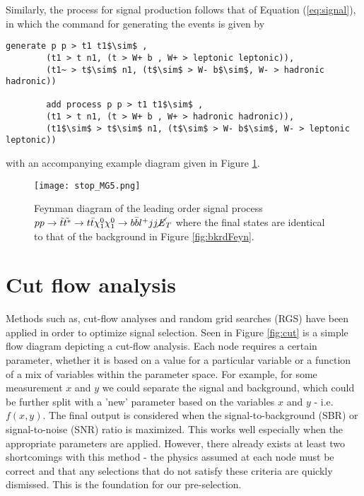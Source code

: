 Similarly, the process for signal production follows that of Equation (\ref{eq:signal}), in which the command for generating the events is given by
\begin{lstlisting}[mathescape = true]
        generate p p > t1 t1$\sim$ ,
        (t1 > t n1, (t > W+ b , W+ > leptonic leptonic)),
        (t1~ > t$\sim$ n1, (t$\sim$ > W- b$\sim$, W- > hadronic hadronic))
        
        add process p p > t1 t1$\sim$ , 
        (t1 > t n1, (t > W+ b , W+ > hadronic hadronic)), 
        (t1$\sim$ > t$\sim$ n1, (t$\sim$ > W- b$\sim$, W- > leptonic leptonic))
\end{lstlisting}
with an accompanying example diagram given in Figure \ref{fig:sigFeyn}. \\


\begin{figure}[htbp]
    \centering
    \texttt{[image: stop\_MG5.png]}
    \caption{Feynman diagram of the leading order signal process $ pp \rightarrow \Tilde{t}\Tilde{t^*} \rightarrow t \Bar{t} \chi^0_1\chi^0_1 \rightarrow b\Bar{b}l^{+}jj\cancel{\it{E}}_{T} $ where the final states are identical to that of the background in Figure \ref{fig:bkrdFeyn}. }
    \label{fig:sigFeyn}
\end{figure}



\section{Cut flow analysis}
Methods such as, cut-flow analyses \cite{kraml2016scalar, aad2014search} and random grid searches (RGS) \cite{bhat2018optimizing} have been applied in order to optimize signal selection. Seen in Figure \ref{fig:cut} is a simple flow diagram depicting a cut-flow analysis. Each node requires a certain parameter, whether it is based on a value for a particular variable or a function of a mix of variables within the parameter space. For example, for some measurement $x$ and $y$ we could separate the signal and background, which could be further split with a 'new' parameter based on the variables $x$ and $y$ - i.e. $f(x,y)$. The final output is considered when the signal-to-background (SBR) or signal-to-noise (SNR) ratio is maximized.
This works well especially when the appropriate parameters are applied. However, there already exists at least two shortcomings with this method - the physics assumed at each node must be correct and that any selections that do not satisfy these criteria are quickly dismissed. This is the foundation for our pre-selection. \\

